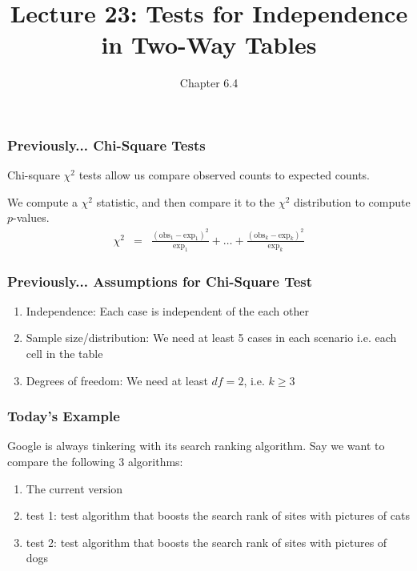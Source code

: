 \documentclass[slides]{beamer}
\title{Lecture 23: Tests for Independence in Two-Way Tables}
\author{Chapter 6.4}
\date{}
\newcommand{\blue}[1]{\textcolor{blue2}{#1}}
\begin{document}
\begin{frame}
\titlepage
\end{frame}


\begin{frame}
\frametitle{Previously... Chi-Square Tests}

Chi-square $\chi^2$ tests allow us compare \blue{observed} counts to \blue{expected} counts.

\vspace{0.5cm}

\pause

We compute a $\chi^2$ statistic, and then compare it to the $\chi^2$ distribution to compute $p$-values.
\begin{eqnarray*}
\chi^2 &=& \frac{(\mbox{obs}_1 - \mbox{exp}_1)^2}{\mbox{exp}_1} + \ldots + \frac{(\mbox{obs}_k - \mbox{exp}_k)^2}{\mbox{exp}_k}
\end{eqnarray*}

\end{frame}


\begin{frame}[fragile]
\frametitle{Previously... Assumptions for Chi-Square Test}
\begin{enumerate}
\item \blue{Independence}:  Each case is independent of the each other
\item \blue{Sample size/distribution}:  We need at least 5 cases in each scenario i.e. each cell in the table
\item \blue{Degrees of freedom}:  We need at least $df=2$, i.e. $k\geq 3$
\end{enumerate}

\end{frame}


\begin{frame}
\frametitle{Today's Example}
Google is always tinkering with its search ranking \blue{algorithm}.  \pause Say we want to compare the following 3 algorithms:
\begin{enumerate}
\pause\item The current version
\pause\item test 1: test algorithm that boosts the search rank of sites with pictures of cats
\pause\item test 2: test algorithm that boosts the search rank of sites with pictures of dogs
\end{enumerate}

\end{frame}
\end{document}
